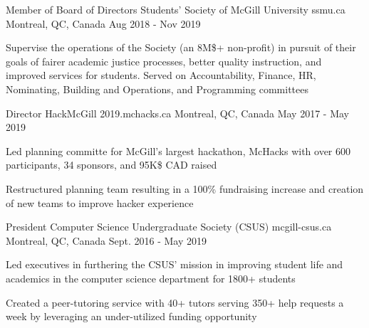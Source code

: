 

\begin{cventries}

  \cventry
    {Member of Board of Directors} %
    {Students' Society of McGill University} %
    {ssmu.ca} %
    {Montreal, QC, Canada} %
    {Aug 2018 - Nov 2019} %
    {
      \begin{cvitems} %
        \item {Supervise the operations of the Society (an 8M\$+ non-profit) in pursuit of their goals of fairer academic justice processes, better quality instruction, and improved services for students. Served on Accountability, Finance, HR, Nominating, Building and Operations,  and Programming committees}
      \end{cvitems}
    }

  \cventry
    {Director} %
    {HackMcGill} %
    {2019.mchacks.ca} %
    {Montreal, QC, Canada} %
    {May 2017 - May 2019} %
    {
      \begin{cvitems} %
        \item {Led planning committe for McGill's largest hackathon, McHacks with over 600 participants, 34 sponsors, and 95K\$ CAD raised }
        \item {Restructured planning team resulting in a 100\% fundraising increase and creation of new teams to improve hacker experience}
      \end{cvitems}
    }

  \cventry
    {President} %
    {Computer Science Undergraduate Society (CSUS)} %
    {mcgill-csus.ca} %
    {Montreal, QC, Canada} %
    {Sept. 2016 - May 2019} %
    {
      \begin{cvitems} %
        \item {Led executives in furthering the CSUS' mission in improving student life and academics in the computer science department for 1800+ students}
        \item {Created a peer-tutoring service with 40+ tutors serving 350+ help requests a week by leveraging an under-utilized funding opportunity}
      \end{cvitems}
    }
    
    
\end{cventries}
